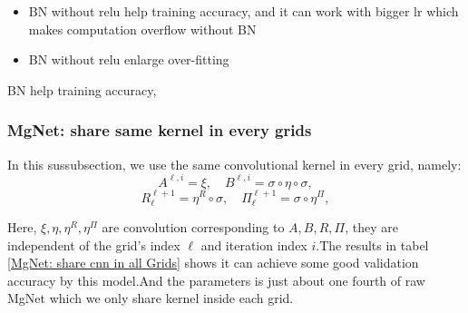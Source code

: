 \begin{itemize}
	\item BN without relu help training accuracy, and it can work with bigger lr which makes computation overflow without BN
	\item BN without relu enlarge over-fitting
\end{itemize}
BN help training accuracy, 
\begin{table}[!htbp]
	\caption{MgNet: activation just on the first grid, BN in every grids}
	\label{data setting3 BN}
	\begin{center}
	\end{center}
\end{table}


\subsubsection{MgNet: share same kernel in every grids}
In this sussubsection, we use the same convolutional kernel in every grid, namely:
\begin{equation}
A^{\ell,i} = \xi, \quad B^{\ell,i} = \sigma \circ  \eta \circ \sigma ,
\end{equation}
\begin{equation}
R_{\ell}^{\ell+1} = \eta^{R} \circ \sigma, \quad \Pi_{\ell}^{\ell+1} = \sigma \circ  \eta^{\Pi} ,
\end{equation}

Here, $\xi,\eta,\eta^{R},\eta^\Pi$ are convolution corresponding to $A,B,R,\Pi$, they are independent of the grid's index $\ell$ and iteration index $i$.The results in tabel \ref{MgNet: share cnn in all Grids} shows it can achieve some good validation accuracy by this model.And the parameters is just about one fourth of raw MgNet which we only share kernel inside each grid.

